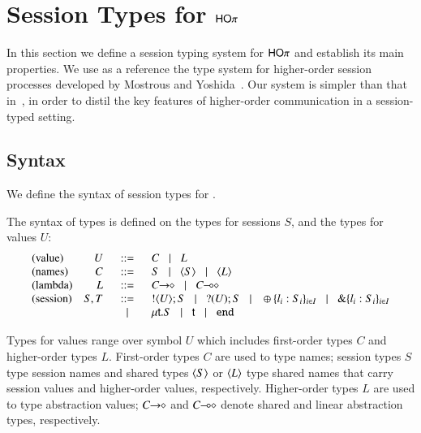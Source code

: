 \section{Session Types for $\mathsf{HO}\pi$}
\label{sec:types}

In this section we define a session typing system for
$\mathsf{HO}\pi$ and establish its main properties. We use as
a reference the type system for higher-order session processes 
developed by Mostrous and Yoshida~\cite{tlca07,mostrous09sessionbased}.
Our system is simpler than that in~\cite{tlca07}, in order to distil the key
features of higher-order communication in a session-typed setting.


\subsection{Syntax}

We define the syntax of session types for \HOp.

\begin{definition}\rm
	\label{def:types}
	The syntax of types is defined on the types for sessions $S$,
	and the types for values $U$:
	\[
	\begin{array}{lrcl}
		\textrm{(value)} & U & \bnfis &		C \bnfbar L 
		\\

		\textrm{(names)} & C & \bnfis &	S \bnfbar \chtype{S} \bnfbar \chtype{L}
		\\

		\textrm{(lambda)} & L & \bnfis &	\shot{C} \bnfbar \lhot{C}
		\\

		\textrm{(session)} & S,T & \bnfis & 	\btout{U} S \bnfbar \btinp{U} S
							\bnfbar \btsel{l_i:S_i}_{i \in I} \bnfbar \btbra{l_i:S_i}_{i \in I}\\
					&&\bnfbar&	\trec{t}{S} \bnfbar \vart{t}  \bnfbar \tinact
	\end{array}
	\]
\end{definition}
%
\noi {}
Types for values range over symbol $U$ which includes
first-order types $C$ and higher-order types $L$.
First-order types $C$ are used to type names;
session types $S$ type session names and shared types
$\langle S \rangle$ or $\langle L \rangle$ type shared names that
carry session values and higher-order values, respectively.
Higher-order types $L$ are used to type abstraction values;
$C\!\! \rightarrow\!\! \diamond$ and $C\!\! \multimap\!\! \diamond$ denote
shared and linear abstraction types, respectively.

